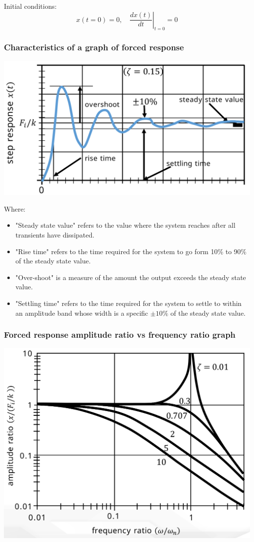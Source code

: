 \documentclass[11pt]{article}
\begin{document}
Initial conditions:
\[x (t = 0) = 0, \quad \left. \frac{dx(t)}{dt} \right|_{t = 0} = 0\]
\subsubsection{Characteristics of a graph of forced response}
\label{sec:orgd904d6e}
\begin{center}
\includegraphics[width=.9\linewidth]{./images/forced-response-graph-characteristics.png}
\end{center}

Where:
\begin{itemize}
\item "Steady state value" refers to the value where the system reaches after all transients have dissipated.
\item "Rise time" refers to the time required for the system to go form 10\% to 90\% of the steady state value.
\item "Over-shoot" is a measure of the amount the output exceeds the steady state value.
\item "Settling time" refers to the time required for the system to settle to within an amplitude band whose width is a specific \(\pm 10\%\) of the steady state value.
\end{itemize}
\subsubsection{Forced response amplitude ratio vs frequency ratio graph}
\label{sec:orgce4d1b9}
\begin{center}
\includegraphics[width=.9\linewidth]{./images/forced-response-amplitude-vs-frequency-graph.png}
\end{center}
\end{document}
